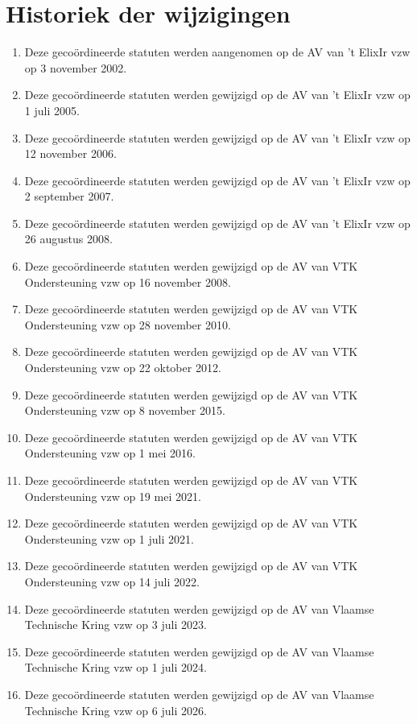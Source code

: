     \section{Historiek der wijzigingen}
    \begin{enumerate}
    \item Deze geco\"ordineerde statuten werden aangenomen op de AV van 't ElixIr vzw op 3 november 2002.
    \item Deze geco\"ordineerde statuten werden gewijzigd op de AV van 't ElixIr vzw op 1 juli 2005.
    \item Deze geco\"ordineerde statuten werden gewijzigd op de AV van 't ElixIr vzw op 12 november 2006.
    \item Deze geco\"ordineerde statuten werden gewijzigd op de AV van 't ElixIr vzw op 2 september 2007.
    \item Deze geco\"ordineerde statuten werden gewijzigd op de AV van 't ElixIr vzw op 26 augustus 2008.
    \item Deze geco\"ordineerde statuten werden gewijzigd op de AV van VTK Ondersteuning vzw op 16 november 2008.
    \item Deze geco\"ordineerde statuten werden gewijzigd op de AV van VTK Ondersteuning vzw op 28 november 2010.
    \item Deze geco\"ordineerde statuten werden gewijzigd op de AV van VTK Ondersteuning vzw op 22 oktober 2012.
    \item Deze geco\"ordineerde statuten werden gewijzigd op de AV van VTK Ondersteuning vzw op 8 november 2015.
    \item Deze geco\"ordineerde statuten werden gewijzigd op de AV van VTK Ondersteuning vzw op 1 mei 2016.
    \item Deze geco\"ordineerde statuten werden gewijzigd op de AV van VTK Ondersteuning vzw op 19 mei 2021.
    \item Deze geco\"ordineerde statuten werden gewijzigd op de AV van VTK Ondersteuning vzw op 1 juli 2021.
    \item Deze geco\"ordineerde statuten werden gewijzigd op de AV van VTK Ondersteuning vzw op 14 juli 2022. 
    \item Deze geco\"ordineerde statuten werden gewijzigd op de AV van Vlaamse Technische Kring vzw op 3 juli 2023.
    \item Deze geco\"ordineerde statuten werden gewijzigd op de AV van Vlaamse Technische Kring vzw op 1 juli 2024.
    \item Deze geco\"ordineerde statuten werden gewijzigd op de AV van Vlaamse Technische Kring vzw op 6 juli 2026.
    \end{enumerate}

